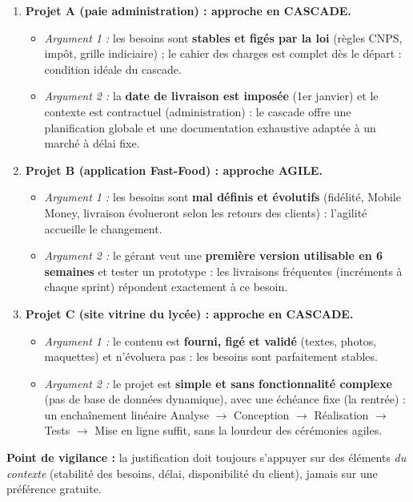 \documentclass[11pt]{article}
\begin{document}
\begin{corrige}
\begin{enumerate}
    \item \textbf{Projet A (paie administration) : approche en CASCADE.}
    \begin{itemize}
        \item \emph{Argument 1 :} les besoins sont \textbf{stables et figés par la loi} (règles CNPS, impôt, grille indiciaire) ; le cahier des charges est complet dès le départ : condition idéale du cascade.
        \item \emph{Argument 2 :} la \textbf{date de livraison est imposée} (1er janvier) et le contexte est contractuel (administration) : le cascade offre une planification globale et une documentation exhaustive adaptée à un marché à délai fixe.
    \end{itemize}
    \item \textbf{Projet B (application Fast-Food) : approche AGILE.}
    \begin{itemize}
        \item \emph{Argument 1 :} les besoins sont \textbf{mal définis et évolutifs} (fidélité, Mobile Money, livraison évolueront selon les retours des clients) : l'agilité accueille le changement.
        \item \emph{Argument 2 :} le gérant veut une \textbf{première version utilisable en 6 semaines} et tester un prototype : les livraisons fréquentes (incréments à chaque sprint) répondent exactement à ce besoin.
    \end{itemize}
    \item \textbf{Projet C (site vitrine du lycée) : approche en CASCADE.}
    \begin{itemize}
        \item \emph{Argument 1 :} le contenu est \textbf{fourni, figé et validé} (textes, photos, maquettes) et n'évoluera pas : les besoins sont parfaitement stables.
        \item \emph{Argument 2 :} le projet est \textbf{simple et sans fonctionnalité complexe} (pas de base de données dynamique), avec une échéance fixe (la rentrée) : un enchaînement linéaire Analyse $\to$ Conception $\to$ Réalisation $\to$ Tests $\to$ Mise en ligne suffit, sans la lourdeur des cérémonies agiles.
    \end{itemize}
\end{enumerate}
\textbf{Point de vigilance :} la justification doit toujours s'appuyer sur des éléments \emph{du contexte} (stabilité des besoins, délai, disponibilité du client), jamais sur une préférence gratuite.
\end{corrige}
\end{document}
